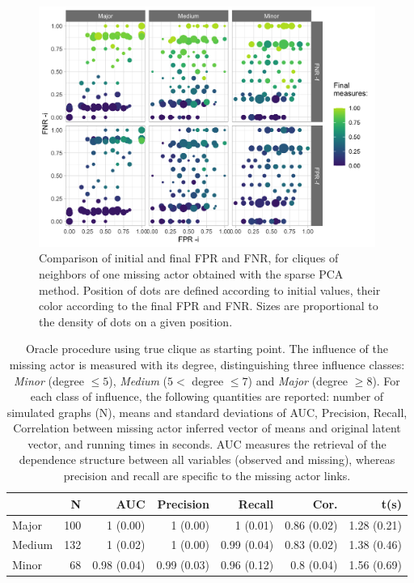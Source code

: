 \begin{figure}[H]
    \centering    \includegraphics[width=11cm]{figs/quali_init_spca.png}
    \caption{Comparison of initial and final FPR and FNR, for cliques of neighbors of one missing actor obtained with the sparse PCA method. Position of dots are defined according to initial values, their color according to the final FPR and FNR. Sizes are proportional to the density of dots on a given position.}
    \label{fig:perfinit}
\end{figure}


 \begin{table}
\centering
\begin{tabular}{lrrrrrr}
  \hline
  & N & AUC & Precision & Recall & Cor. &t(s) \\ 
  \hline
  Major & 100 & 1 (0.00) & 1 (0.00) & 1 (0.01) & 0.86 (0.02)  & 1.28 (0.21) \\ 
  Medium & 132 & 1 (0.02) & 1 (0.00) & 0.99 (0.04) & 0.83 (0.02)  & 1.38 (0.46)  \\ 
  Minor &  68 & 0.98 (0.04) & 0.99 (0.03) & 0.96 (0.12) & 0.8 (0.04)& 1.56 (0.69) \\ 
   \hline
\end{tabular}
 \caption{\label{tab:oracle} Oracle procedure using true clique as starting point. The influence of the missing actor is measured with its degree, distinguishing three influence classes: \textit{Minor} (degree $\leq 5$), \textit{Medium} ($5<$ degree $\leq 7$) and \textit{Major} (degree $\geq 8$).  For each class of influence, the following quantities are reported:  number of simulated graphs (N), means and standard deviations of AUC, Precision, Recall, Correlation between missing actor inferred vector of means and original latent vector, and running times in seconds. AUC measures the retrieval of the dependence structure between all variables (observed and missing), whereas precision and recall are specific to the missing actor links.}
\end{table}